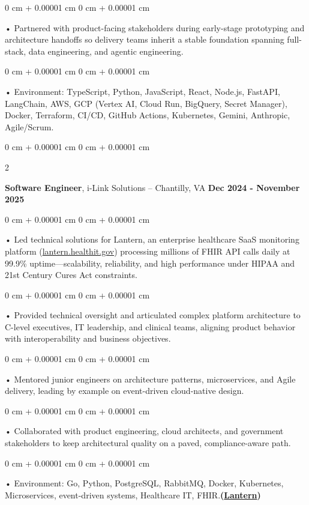 \documentclass[10pt, letterpaper]{article}
\newenvironment{onecolentry}{
    \begin{adjustwidth}{
        0 cm + 0.00001 cm
    }{
        0 cm + 0.00001 cm
    }
}{
    \end{adjustwidth}
} %
\newenvironment{twocolentry}[2][]{
    \onecolentry
    \def\secondColumn{#2}
    \setcolumnwidth{\fill, 4.5 cm}
    \begin{paracol}{2}
}{
    \switchcolumn \raggedleft \secondColumn
    \end{paracol}
    \endonecolentry
} %
\begin{document}
        \begin{onecolentry}
             • Partnered with product-facing stakeholders during early-stage prototyping and architecture handoffs so delivery teams inherit a stable foundation spanning full-stack, data engineering, and agentic engineering.
        \end{onecolentry}
        \begin{onecolentry}
             • Environment: TypeScript, Python, JavaScript, React, Node.js, FastAPI, LangChain, AWS, GCP (Vertex AI, Cloud Run, BigQuery, Secret Manager), Docker, Terraform, CI/CD, GitHub Actions, Kubernetes, Gemini, Anthropic, Agile/Scrum.
        \end{onecolentry}

        \vspace{0.1cm}

        \begin{twocolentry}{
            \textbf{Dec 2024 - November 2025}
        }
            \textbf{Software Engineer}, i-Link Solutions -- Chantilly, VA\end{twocolentry}


        \begin{onecolentry}
             • Led technical solutions for Lantern, an enterprise healthcare SaaS monitoring platform (\href{https://lantern.healthit.gov/?tab=dashboard_tab}{lantern.healthit.gov}) processing millions of FHIR API calls daily at 99.9\% uptime---scalability, reliability, and high performance under HIPAA and 21st Century Cures Act constraints.
        \end{onecolentry}
        \begin{onecolentry}
             • Provided technical oversight and articulated complex platform architecture to C-level executives, IT leadership, and clinical teams, aligning product behavior with interoperability and business objectives.
        \end{onecolentry}
        \begin{onecolentry}
             • Mentored junior engineers on architecture patterns, microservices, and Agile delivery, leading by example on event-driven cloud-native design.
        \end{onecolentry}
        \begin{onecolentry}
             • Collaborated with product engineering, cloud architects, and government stakeholders to keep architectural quality on a paved, compliance-aware path.
        \end{onecolentry}
        \begin{onecolentry}
             • Environment: Go, Python, PostgreSQL, RabbitMQ, Docker, Kubernetes, Microservices, event-driven systems, Healthcare IT, FHIR.\textbf{(\href{https://lantern.healthit.gov/?tab=dashboard_tab}{Lantern})}
        \end{onecolentry}
        \vspace{0.1cm}
\end{document}
